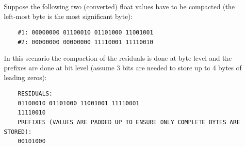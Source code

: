 Suppose the following two (converted) float values have to be compacted (the left-most byte is the most significant byte):
\begin{center}
  \begin{verbatim}
    #1: 00000000 01100010 01101000 11001001
    #2: 00000000 00000000 11110001 11110010
  \end{verbatim}
\end{center}
In this scenario the compaction of the residuals is done at byte level and the prefixes are done at bit level (assume 3 bits are needed to store up to 4 bytes of leading zeros):
\begin{center}
  \begin{verbatim}
    RESIDUALS:
    01100010 01101000 11001001 11110001 
    11110010
    PREFIXES (VALUES ARE PADDED UP TO ENSURE ONLY COMPLETE BYTES ARE STORED):
    00101000
  \end{verbatim}
\end{center} 
